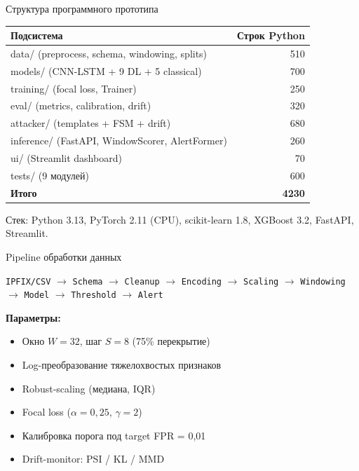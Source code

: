 \documentclass[14pt, aspectratio=169]{beamer}
\begin{document}
\begin{frame}{Структура программного прототипа}
\centering
\footnotesize
\begin{tabular}{lr}
\toprule
\textbf{Подсистема} & \textbf{Строк Python} \\
\midrule
data/ (preprocess, schema, windowing, splits)  & ~510 \\
models/ (CNN-LSTM + 9 DL + 5 classical)         & ~700 \\
training/ (focal loss, Trainer)                 & ~250 \\
eval/ (metrics, calibration, drift)             & ~320 \\
attacker/ (templates + FSM + drift)             & ~680 \\
inference/ (FastAPI, WindowScorer, AlertFormer) & ~260 \\
ui/ (Streamlit dashboard)                       & ~70 \\
tests/ (9 модулей)                              & ~600 \\
\midrule
\textbf{Итого}                                  & \textbf{~4230} \\
\bottomrule
\end{tabular}

\vspace{0.3cm}
\small Стек: Python 3.13, PyTorch 2.11 (CPU), scikit-learn 1.8,
XGBoost 3.2, FastAPI, Streamlit.
\end{frame}

\begin{frame}{Pipeline обработки данных}
\centering
\begin{block}{}
\centering
\texttt{IPFIX/CSV} $\to$ \texttt{Schema} $\to$ \texttt{Cleanup} $\to$
\texttt{Encoding} $\to$ \texttt{Scaling} $\to$ \texttt{Windowing}
$\to$ \texttt{Model} $\to$ \texttt{Threshold} $\to$ \texttt{Alert}
\end{block}

\textbf{Параметры:}
\begin{itemize}
    \item Окно $W = 32$, шаг $S = 8$ (75\% перекрытие)
    \item Log-преобразование тяжелохвостых признаков
    \item Robust-scaling (медиана, IQR)
    \item Focal loss ($\alpha = 0{,}25$, $\gamma = 2$)
    \item Калибровка порога под target FPR = 0{,}01
    \item Drift-monitor: PSI / KL / MMD
\end{itemize}
\end{frame}
\end{document}
